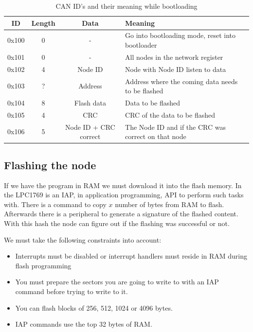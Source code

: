 \documentclass[twocolumn]{article}
\begin{document}
			\begin{table}[t]
				\caption{CAN ID's and their meaning while bootloading}
			
				\centering
				\begin{tabular}{|c|c|c|l|}
					\hline
					\textbf{ID} & \textbf{Length} & \textbf{Data} & \textbf{Meaning} \\ \hline
					0x100       & 0               & -                     & Go into bootloading mode, reset into bootloader \\ \hline
					0x101       & 0               & -                     & All nodes in the network register \\ \hline
					0x102       & 4               & Node ID               & Node with Node ID listen to data \\ \hline
					0x103       & ?               & Address               & Address where the coming data needs to be flashed \\ \hline
					0x104       & 8               & Flash data            & Data to be flashed \\ \hline
					0x105       & 4               & CRC                   & CRC of the data to be flashed \\ \hline
					0x106       & 5               & Node ID + CRC correct & The Node ID and if the CRC was correct on that node \\ \hline
				\end{tabular}
			\end{table}
	
	\subsection*{Flashing the node}
		If we have the program in RAM we must download it into the flash memory.
		In the LPC1769 is an IAP, in application programming, API to perform such tasks with.
		There is a command to copy $x$ number of bytes from RAM to flash.
		Afterwards there is a peripheral to generate a signature of the flashed content.
		With this hash the node can figure out if the flashing was successful or not.
		
		We must take the following constraints into account:
		\begin{itemize}
			\item Interrupts must be disabled or interrupt handlers must reside in RAM during flash programming
			\item You must prepare the sectors you are going to write to with an IAP command before trying to write to it.
			\item You can flash blocks of 256, 512, 1024 or 4096 bytes.
			\item IAP commands use the top 32 bytes of RAM.
		\end{itemize}
	
\end{document}
